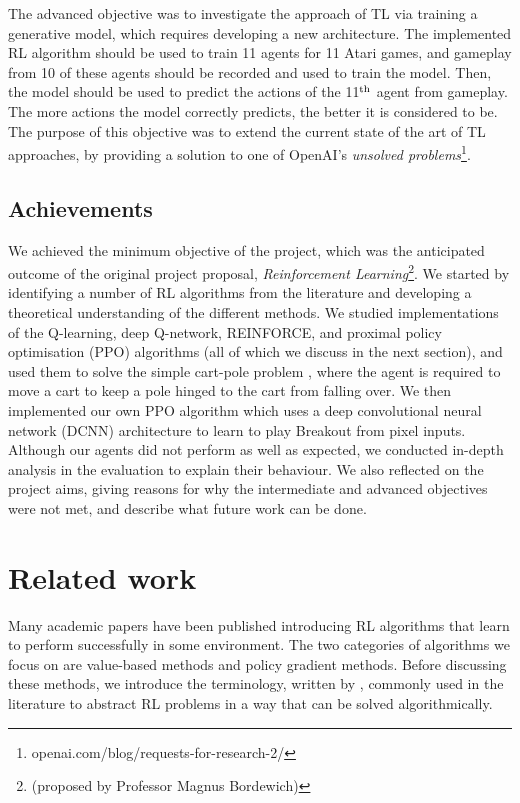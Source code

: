 \documentclass[12pt,a4paper]{article}
\begin{document}
The advanced objective was to investigate the approach of TL via training a generative model, which requires developing a new architecture. The implemented RL algorithm should be used to train 11 agents for 11 Atari games, and gameplay from 10 of these agents should be recorded and used to train the model. Then, the model should be used to predict the actions of the 11$\textsuperscript{th}$ agent from gameplay. The more actions the model correctly predicts, the better it is considered to be. The purpose of this objective was to extend the current state of the art of TL approaches, by providing a solution to one of OpenAI's \emph{unsolved problems}\footnote{openai.com/blog/requests-for-research-2/}.   

\subsection{Achievements}
We achieved the minimum objective of the project, which was the anticipated outcome of the original project proposal, \emph{Reinforcement Learning}\footnote{(proposed by Professor Magnus Bordewich)}. We started by identifying a number of RL algorithms from the literature and developing a theoretical understanding of the different methods. We studied implementations of the Q-learning, deep Q-network, REINFORCE, and proximal policy optimisation (PPO) algorithms (all of which we discuss in the next section), and used them to solve the simple cart-pole problem \cite{sutton2018reinforcement}, where the agent is required to move a cart to keep a pole hinged to the cart from falling over. We then implemented our own PPO algorithm which uses a deep convolutional neural network (DCNN) architecture to learn to play Breakout from pixel inputs. Although our agents did not perform as well as expected, we conducted in-depth analysis in the evaluation to explain their behaviour. We also reflected on the project aims, giving reasons for why the intermediate and advanced objectives were not met, and describe what future work can be done.      

\section{Related work}
Many academic papers have been published introducing RL algorithms that learn to perform successfully in some environment. The two categories of algorithms we focus on are value-based methods and policy gradient methods. Before discussing these methods, we introduce the terminology, written by \cite{SpinningUp2018}, commonly used in the literature to abstract RL problems in a way that can be solved algorithmically.
\end{document}
